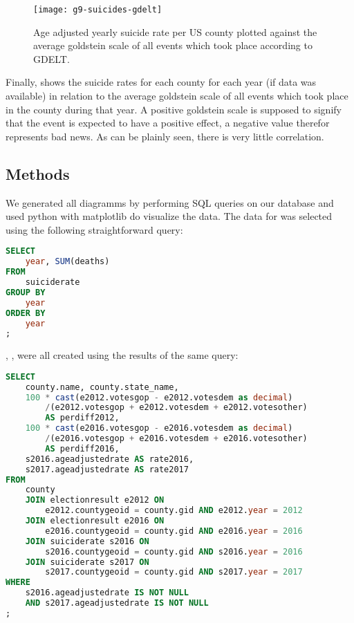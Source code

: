 \begin{figure}[tb]
\centering
\texttt{[image: g9-suicides-gdelt]}
\caption{Age adjusted yearly suicide rate per US county plotted against the average goldstein scale of all events which took place according to GDELT.}
\label{fig:suicides-gdelt}
\end{figure}

\par
Finally,  shows the suicide rates for each county for each year (if data was available) in relation to the average goldstein scale of all events which took place in the county during that year.
A positive goldstein scale is supposed to signify that the event is expected to have a positive effect, a negative value therefor represents bad news.
As can be plainly seen, there is very little correlation.

\subsection{Methods}

We generated all diagramms by performing SQL queries on our database and used python with matplotlib do visualize the data.
The data for  was selected using the following straightforward query:

\begin{lstlisting}[language=SQL]
SELECT
    year, SUM(deaths)
FROM 
    suiciderate
GROUP BY
    year 
ORDER BY
    year
;
\end{lstlisting}

, ,  were all created using the results of the same query:

\begin{lstlisting}[language=SQL]
SELECT
    county.name, county.state_name,
    100 * cast(e2012.votesgop - e2012.votesdem as decimal)
        /(e2012.votesgop + e2012.votesdem + e2012.votesother) 
        AS perdiff2012,
    100 * cast(e2016.votesgop - e2016.votesdem as decimal)
        /(e2016.votesgop + e2016.votesdem + e2016.votesother) 
        AS perdiff2016,
    s2016.ageadjustedrate AS rate2016,
    s2017.ageadjustedrate AS rate2017
FROM
    county
    JOIN electionresult e2012 ON 
        e2012.countygeoid = county.gid AND e2012.year = 2012
    JOIN electionresult e2016 ON 
        e2016.countygeoid = county.gid AND e2016.year = 2016
    JOIN suiciderate s2016 ON 
        s2016.countygeoid = county.gid AND s2016.year = 2016
    JOIN suiciderate s2017 ON 
        s2017.countygeoid = county.gid AND s2017.year = 2017
WHERE
    s2016.ageadjustedrate IS NOT NULL 
    AND s2017.ageadjustedrate IS NOT NULL
;
\end{lstlisting}

